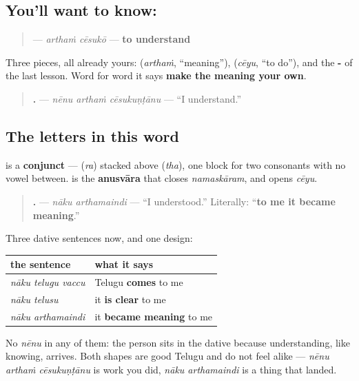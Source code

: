 \subsection*{You'll want to know:  }
\begin{quote}
\textbf{ } — \emph{arthaṁ cēsukō} — \textbf{to understand}
\end{quote}

Three pieces, all already yours: \textbf{} (\emph{arthaṁ}, \textquotedblleft{}meaning\textquotedblright{}), \textbf{} (\emph{cēyu}, \textquotedblleft{}to do\textquotedblright{}), and the \textbf{-} of the last lesson. Word for word it says \textbf{make the meaning your own}.

\begin{quote}
\textbf{  .} — \emph{nēnu arthaṁ cēsukuṇṭānu} — \textquotedblleft{}I understand.\textquotedblright{}
\end{quote}

\subsection*{The letters in this word}
\textbf{} is a \textbf{conjunct} — \textbf{} (\emph{ra}) stacked above \textbf{} (\emph{tha}), one block for two consonants with no vowel between. \textbf{} is the \textbf{anusvāra} that closes \emph{namaskāram}, and \textbf{} opens \emph{cēyu}.

\begin{grammarlens}[title={Grammar Lens: the other way to say it, with no \textquotedblleft{}I\textquotedblright{} in it}]
\begin{quote}
\textbf{ .} — \emph{nāku arthamaindi} — \textquotedblleft{}I understood.\textquotedblright{} Literally: \textquotedblleft{}\textbf{to me it became meaning}.\textquotedblright{}
\end{quote}

Three dative sentences now, and one design:

\noindent
\begin{tabularx}{\linewidth}{@{}>{\raggedright\arraybackslash}X>{\raggedright\arraybackslash}X@{}}
\toprule
\textbf{the sentence} & \textbf{what it says} \\
\midrule
\emph{nāku telugu vaccu} & Telugu \textbf{comes} to me \\
\emph{nāku telusu} & it \textbf{is clear} to me \\
\emph{nāku arthamaindi} & it \textbf{became meaning} to me \\
\bottomrule
\end{tabularx}

No \emph{nēnu} in any of them: the person sits in the dative because understanding, like knowing, arrives. Both shapes are good Telugu and do not feel alike — \emph{nēnu arthaṁ cēsukuṇṭānu} is work you did, \emph{nāku arthamaindi} is a thing that landed.
\end{grammarlens}

